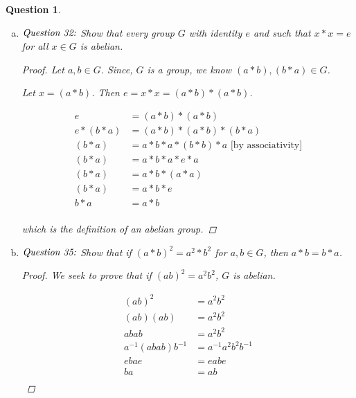 \documentclass{article}
\newtheorem{ques}{Question}
\begin{document}
\begin{ques}
\begin{enumerate}[(a)]
\begin{enumerate}[(a)]
			\item
			Explain the significance of this exercise.
			\begin{proof}
			To check if a binary operation paired with a set is a group you simply carry out the above steps/checks.
			\end{proof}

		\end{enumerate}
		
		
		\item 
		$\emph{Question 32:}$ Show that every group $G$ with identity $e$ and such that $x*x = e$ for all $x \in G$ is abelian.
		\begin{proof}
			Let $a, b \in G$. Since, $G$ is a group, we know $(a * b), (b * a) \in G$. 
			
			Let $x = (a * b)$. Then $e = x * x = (a * b) * (a * b)$.
			
			\begin{align*} 
			e &= (a * b) * (a * b) \\
			e * (b * a) &= (a * b) * (a * b) * (b * a) \\ 
			(b * a) &= a * b * a * (b * b) * a \text{ [by associativity]} \\
			(b * a) &= a * b * a * e * a \\
			(b * a) &= a * b * (a * a) \\
			(b * a) &= a * b * e \\
			b * a &= a * b \\
			\end{align*}
			
			which is the definition of an abelian group.
		\end{proof}
		
		\item 
		$\emph{Question 35:}$ Show that if $(a * b)^2 = a^2 * b^2$ for $a,b \in G$, then $a *b = b * a$.
		\begin{proof}
			We seek to prove that if $(ab)^2 = a^2b^2$, $G$ is abelian.
			
			\begin{align*} 
			(ab)^2 &= a^2b^2 \\
			(ab)(ab) &= a^2b^2 \\ 
			abab &= a^2b^2 \\
			a^{-1}(abab)b^{-1} &= a^{-1}a^2b^2b^{-1} \\
			ebae &= eabe \\
			ba &= ab \\
			\end{align*}
			

\end{proof}
\end{enumerate}
\end{ques}
\end{document}
